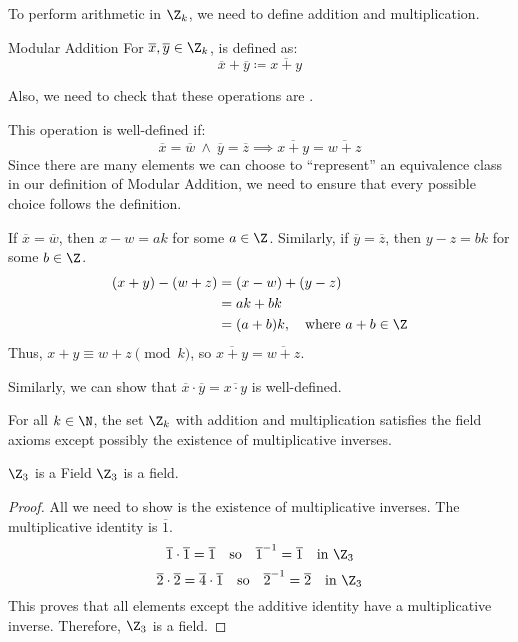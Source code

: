 \documentclass[letterpaper,12pt]{report}
\begin{document}
To perform arithmetic in $\Z_k$, we need to define addition and multiplication.

\begin{dfnbox}{Modular Addition}{}
    For $\overline{x}, \overline{y} \in \Z_k$,  is defined as:
    \[ \overline{x} + \overline{y} \coloneq \overline{x+y} \]
\end{dfnbox}

Also, we need to check that these operations are .


This operation is well-defined if:
\[ \overline{x} = \overline{w}\ \land\ \overline{y} = \overline{z} \implies \overline{x+y} = \overline{w+z} \]
Since there are many elements we can choose to ``represent'' an equivalence class in our definition of Modular Addition, we need to ensure that every possible choice follows the definition.

If $\overline{x} = \overline{w}$, then $x - w = ak$ for some $a \in \Z$. Similarly, if $\overline{y} = \overline{z}$, then $y - z = bk$ for some $b \in \Z$.
\begin{align*}
    (x+y) - (w+z) &= (x-w) + (y-z) \\
    &= ak + bk \\
    &= (a+b)k, \quad \text{where}\ a+b \in \Z
\end{align*}
Thus, $x+y \equiv w+z \pmod{k}$, so $\overline{x+y} = \overline{w+z}$.

Similarly, we can show that $\overline{x} \cdot \overline{y} = \overline{x \cdot y}$ is well-defined.

For all $k \in \N$, the set $\Z_k$ with addition and multiplication satisfies the field axioms except possibly the existence of multiplicative inverses.

\begin{exbox}{$\Z_3$ is a Field}{}
    $\Z_3$ is a field.
    \tcblower
    \begin{proof}
        All we need to show is the existence of multiplicative inverses. The multiplicative identity is $\overline{1}$.
        \[ \overline{1} \cdot \overline{1} = \overline{1} \quad \text{so} \quad \overline{1}^{-1} = \overline{1} \quad \text{in}\ \Z_3 \]
        \[ \overline{2} \cdot \overline{2} = \overline{4} \cdot \overline{1} \quad \text{so} \quad \overline{2}^{-1} = \overline{2} \quad \text{in}\ \Z_3 \]
        This proves that all elements except the additive identity have a multiplicative inverse. Therefore, $\Z_3$ is a field.
    \end{proof}
\end{exbox}
\end{document}

